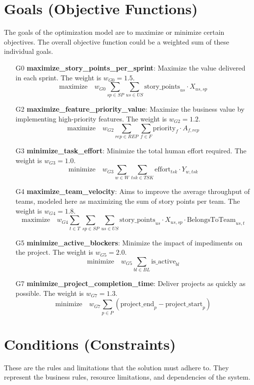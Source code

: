 \documentclass[11pt]{article}
\begin{document}
\section{Goals (Objective Functions)}
The goals of the optimization model are to maximize or minimize certain objectives. The overall objective function could be a weighted sum of these individual goals.

\begin{itemize}
    \item[G0] \textbf{maximize\_story\_points\_per\_sprint}: Maximize the value delivered in each sprint. The weight is $w_{G0}=1.5$.
    $$ \text{maximize} \quad w_{G0} \sum_{sp \in SP} \sum_{us \in US} \text{story\_points}_{us} \cdot X_{us,sp} $$
    \item[G2] \textbf{maximize\_feature\_priority\_value}: Maximize the business value by implementing high-priority features. The weight is $w_{G2}=1.2$.
    $$ \text{maximize} \quad w_{G2} \sum_{rep \in REP} \sum_{f \in F} \text{priority}_f \cdot A_{f,rep} $$
    \item[G3] \textbf{minimize\_task\_effort}: Minimize the total human effort required. The weight is $w_{G3}=1.0$.
    $$ \text{minimize} \quad w_{G3} \sum_{w \in W} \sum_{tsk \in TSK} \text{effort}_{tsk} \cdot Y_{w,tsk} $$
    \item[G4] \textbf{maximize\_team\_velocity}: Aims to improve the average throughput of teams, modeled here as maximizing the sum of story points per team. The weight is $w_{G4}=1.8$.
    $$ \text{maximize} \quad w_{G4} \sum_{t \in T} \sum_{sp \in SP} \sum_{us \in US} \text{story\_points}_{us} \cdot X_{us,sp} \cdot \text{BelongsToTeam}_{us,t} $$
    \item[G5] \textbf{minimize\_active\_blockers}: Minimize the impact of impediments on the project. The weight is $w_{G5}=2.0$.
    $$ \text{minimize} \quad w_{G5} \sum_{bl \in BL} \text{is\_active}_{bl} $$
    \item[G7] \textbf{minimize\_project\_completion\_time}: Deliver projects as quickly as possible. The weight is $w_{G7}=1.3$.
    $$ \text{minimize} \quad w_{G7} \sum_{p \in P} (\text{project\_end}_p - \text{project\_start}_p) $$
\end{itemize}

\section{Conditions (Constraints)}
These are the rules and limitations that the solution must adhere to. They represent the business rules, resource limitations, and dependencies of the system.
\end{document}
